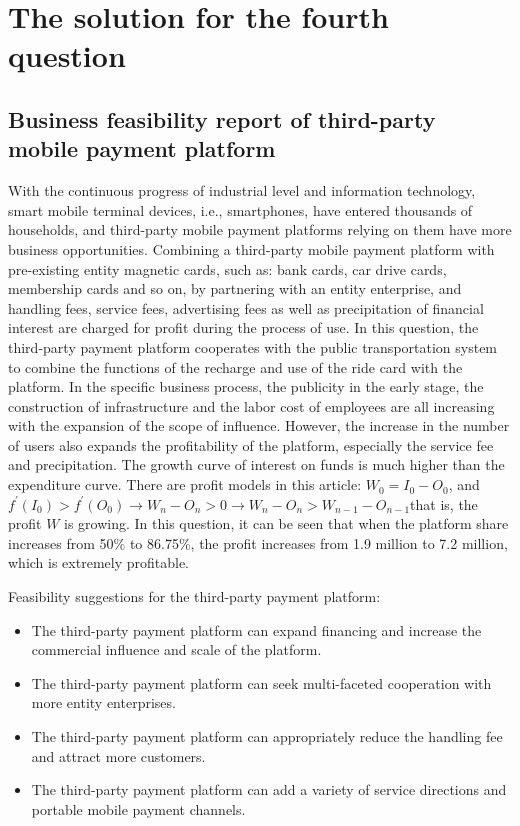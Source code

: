 \documentclass[../mcmpaper]{subfiles}
\begin{document}
\section{The solution for the fourth question}
\subsection{Business feasibility report of third-party mobile payment platform}
With the continuous progress of industrial level and information technology, smart mobile terminal devices, i.e., smartphones, have entered thousands of households, and third-party mobile payment platforms relying on them have more business opportunities. Combining a third-party mobile payment platform with pre-existing entity magnetic cards, such as: bank cards, car drive cards, membership cards and so on, by partnering with an entity enterprise, and handling fees, service fees, advertising fees as well as precipitation of financial interest are charged for profit during the process of use.
In this question, the third-party payment platform cooperates with the public transportation system to combine the functions of the recharge and use of the ride card with the platform. In the specific business process, the publicity in the early stage, the construction of infrastructure and the labor cost of employees are all increasing with the expansion of the scope of influence. However, the increase in the number of users also expands the profitability of the platform, especially the service fee and precipitation. The growth curve of interest on funds is much higher than the expenditure curve. There are profit models in this article: $W_{0}=I_{0}-O_{0}$, and $f^{\prime}\left(I_{0}\right)>f^{\prime}\left(O_{0}\right) \rightarrow W_{n}-O_{n}>0 \rightarrow W_{n}-O_{n}>W_{n-1}-O_{n-1}$that is, the profit $W$ is growing. In this question, it can be seen that when the platform share increases from 50\% to 86.75\%, the profit increases from 1.9 million to 7.2 million, which is extremely profitable.
\par
Feasibility suggestions for the third-party payment platform:
\begin{itemize}
    \item The third-party payment platform can expand financing and increase the commercial influence and scale of the platform. 
    \item The third-party payment platform can seek multi-faceted cooperation with more entity enterprises.
    \item The third-party payment platform can appropriately reduce the handling fee and attract more customers. 
    \item The third-party payment platform can add a variety of service directions and portable mobile payment channels.
\end{itemize}
\end{document}
